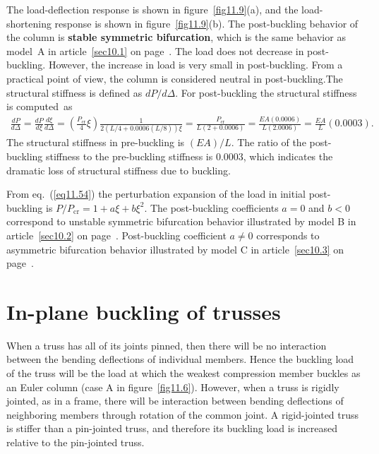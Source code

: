 \documentclass{AeroStructure-ERJohnson}
\begin{document}
\begin{example}
 The load-deflection response is shown in figure~\ref{fig11.9}(a), and the load-shortening response is shown in figure~\ref{fig11.9}(b). The post-buckling behavior of the column is \textbf{stable symmetric bifurcation}, which is the same behavior as model~A in article~\ref{sec10.1} on page~\pageref{sec10.1}. The load does not decrease in post-buckling. However, the increase in load is very small in post-buckling. From a practical point of view, the column is considered\vadjust{\vspace*{8pt}\pagebreak} neutral in post-buckling.The structural stiffness is defined as $d P/d \Delta$. For post-buckling the structural stiffness is computed~as
\begin{align*}
\frac{d P}{d \Delta}=\frac{d P}{d \xi} \frac{d \xi}{d \Delta}=\left(\frac{P_{\mathrm{cr}}}{4} \xi\right) \frac{1}{2(L/ 4+0.0006(L/8)) \xi}=\frac{P_{\mathrm{cr}}}{L(2+0.0006)}=\frac{E A(0.0006)}{L(2.0006)}=\frac{E A}{L}(0.0003).
\end{align*}
The structural stiffness in pre-buckling is $(E A)/L$. The ratio of the post-buckling stiffness to the pre-buckling stiffness is 0.0003, which indicates the dramatic loss of structural stiffness due to buckling.
\end{example}

From eq.~(\ref{eq11.54}) the perturbation expansion of the load in initial post-buckling is $P/P_{\mathrm{cr}}=1+a \xi+b \xi^{2}$. The post-buckling coefficients $a=0$ and $b<0$ correspond to unstable symmetric bifurcation behavior illustrated by model B in article~\ref{sec10.2} on page~\pageref{sec10.2}. Post-buckling coefficient $a \neq 0$ corresponds to asymmetric bifurcation behavior illustrated by model C in article~\ref{sec10.3} on page~\pageref{sec10.3}.

\section{In-plane buckling of trusses}\label{sec11.3}

When a truss has all of its joints pinned, then there will be no interaction between the bending deflections of individual members. Hence the buckling load of the truss will be the load at which the weakest compression member buckles as an Euler column (case A in figure~\ref{fig11.6}). However, when a truss is rigidly jointed, as in a frame, there will be interaction between bending deflections of neighboring members through rotation of the common joint. A rigid-jointed truss is stiffer than a pin-jointed truss, and therefore its buckling load is increased relative to the pin-jointed truss.
\end{document}

